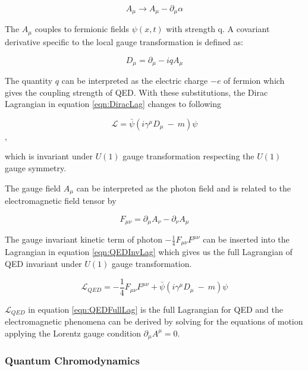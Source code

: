 \begin{equation}
A_{\mu}\rightarrow A_{\mu} - \partial _{\mu} \alpha
\label{eqn:QEDGaugeField}
\end{equation}  

The $A_{\mu}$ couples to fermionic fields $\psi(x,t)$ with strength q. A covariant derivative specific to the local gauge transformation is defined as:

\begin{equation}
D_{\mu} = \partial_{\mu} - iqA_{\mu}
\label{eqn:QEDCovDerv}
\end{equation}  

The quantity $q$ can be interpreted as the electric charge $-e$ of fermion which gives the coupling strength of QED. With these substitutions, the Dirac Lagrangian in equation \ref{eqn:DiracLag} changes to following

\begin{equation}
\mathcal{L} = \bar{\psi} ( i \gamma^{\mu} D_{\mu} ~-~ m) \psi
\label{eqn:QEDInvLag}
\end{equation},

which is invariant under $U(1)$ gauge transformation respecting the $U(1)$ gauge symmetry. 

The gauge field $A_{\mu}$ can be interpreted as the photon field and is related to the electromagnetic field tensor by

\begin{equation}
F_{\mu\nu} = \partial_{\mu}A_{\nu} - \partial_{\nu}A_{\mu}
\label{QEDFieldTensor}
\end{equation}

The gauge invariant kinetic term of photon $-\frac{1}{4}F_{\mu\nu}F^{\mu\nu}$ can be inserted into the Lagrangian in equation \ref{eqn:QEDInvLag} which gives us the full Lagrangian of QED invariant under $U(1)$ gauge transformation. 

\begin{equation}
\mathcal{L}_{QED} = -\frac{1}{4}F_{\mu\nu}F^{\mu\nu} + \bar{\psi} ( i \gamma^{\mu} D_{\mu} ~-~ m) \psi
\label{eqn:QEDFullLag}
\end{equation}

$\mathcal{L}_{QED}$ in equation \ref{eqn:QEDFullLag} is the full Lagrangian for QED and the electromagnetic phenomena can be derived by solving for the equations of motion applying the Lorentz gauge condition $\partial_{\mu}A^{\mu}=0$. 

\subsubsection{Quantum Chromodynamics }
\label{subsubsec:QCD}

